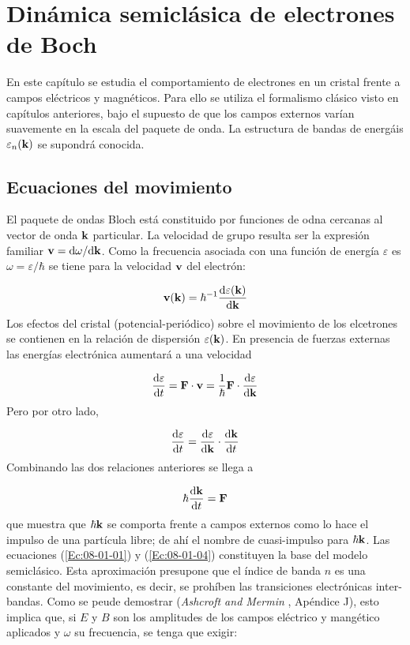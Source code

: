 \chapter{Dinámica semiclásica de electrones de Boch} \label{Ch:08}

En este capítulo se estudia el comportamiento de electrones en un cristal frente a campos eléctricos y magnéticos. Para ello se utiliza el formalismo clásico visto en capítulos anteriores, bajo el supuesto de que los campos externos varían suavemente en la escala del paquete de onda. La estructura de bandas de energáis $\varepsilon_n (\mathbf{k})$ se supondrá conocida.

\section{Ecuaciones del movimiento}

El paquete de ondas Bloch está constituido por funciones de odna cercanas al vector de onda $\mathbf{k}$ particular. La velocidad de grupo resulta ser la expresión familiar $\mathbf{v}=\mathrm{d} \omega / \mathrm{d} \mathbf{k}$. Como la frecuencia asociada con una función de energía $\varepsilon$ es $\omega = \varepsilon/\hbar$ se tiene para la velocidad $\mathbf{v}$ del electrón:

\begin{equation}
	\mathbf{v} (\mathbf{k}) = \hbar^{-1} \frac{\mathrm{d} \varepsilon(\mathbf{k})}{\mathrm{d} \mathbf{k}} \label{Ec:08-01-01}
\end{equation}
Los efectos del cristal (potencial-periódico) sobre el movimiento de los elcetrones se contienen en la relación de dispersión $\varepsilon(\mathbf{k})$. En presencia de fuerzas externas las energías electrónica aumentará a una velocidad 

\begin{equation}
	\frac{\mathrm{d} \varepsilon}{\mathrm{d} t} = \mathbf{F} \cdot \mathbf{v} = \frac{1}{\hbar} \mathbf{F} \cdot \frac{\mathrm{d} \varepsilon}{\mathrm{d} \mathbf{k}}
\end{equation}
Pero por otro lado,

\begin{equation}
	\frac{\mathrm{d} \varepsilon}{\mathrm{d} t} = \frac{\mathrm{d} \varepsilon}{\mathrm{d} \mathbf{k}} \cdot \frac{\mathrm{d} \mathbf{k}}{\mathrm{d} t}
\end{equation}
Combinando las dos relaciones anteriores se llega a

\begin{equation}
	\hbar \frac{\mathrm{d} \mathbf{k}}{\mathrm{d} t} = \mathbf{F} \label{Ec:08-01-04}
\end{equation}	
que muestra que $\hbar \mathbf{k}$ se comporta frente a campos externos como lo hace el impulso de una partícula libre; de ahí el nombre de cuasi-impulso para $\hbar \mathbf{k}$. Las ecuaciones (\ref{Ec:08-01-01}) y (\ref{Ec:08-01-04}) constituyen la base del modelo semiclásico. Esta aproximación presupone que el índice de banda $n$ es una constante del movimiento, es decir, se prohíben las transiciones electrónicas inter-bandas. Como se peude demostrar (\textit{Ashcroft and Mermin} \cite{Mermin_Solid_State}, Apéndice J), esto implica que, si $E$ y $B$ son los amplitudes de los campos eléctrico y mangético aplicados y $\omega$ su frecuencia, se tenga que exigir:

